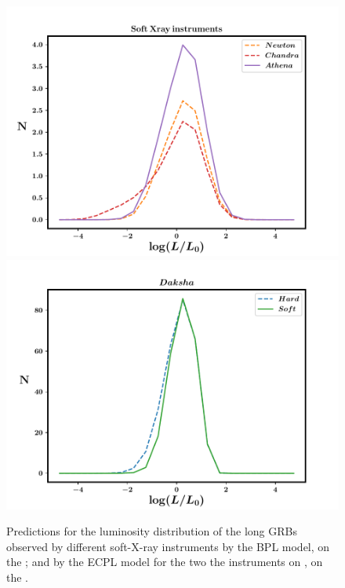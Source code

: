 \begin{figure}
\begin{center}
\includegraphics[scale=0.42]{predictions--long--BPL}
\includegraphics[scale=0.42]{predictions--long--ECPL}
\caption[Predictions for the luminosity distributions for several GRB detectors]{Predictions for the luminosity distribution of the long GRBs observed by different soft-X-ray instruments by the BPL model, on the \eL; and by the ECPL model for the two the instruments on \D, on the \eR.}
\label{fig:N(L)_for_soft_Xray_instruments}
\end{center}
\end{figure}

